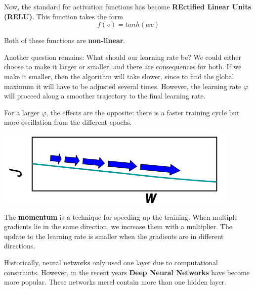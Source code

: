 \documentclass{tufte-handout}
\begin{document}
Now, the standard for activation functions has become \textbf{REctified Linear Units (RELU)}. 
This function takes the form
\[ f(v) = tanh(\alpha v)\]

Both of these functions are \textbf{non-linear}.

Another question remains: What should our learning rate be?
We could either choose to make it larger or smaller, and there are consequences for both.
If we make it smaller, then the algorithm will take slower, since to find the global maximum it 
	will have to be adjusted several times. However, the learning rate $\varphi$ will proceed along
	a smoother trajectory to the final learning rate.

For a larger $\varphi$,  the effects are the opposite: there is a faster training cycle but more
	oscillation from the different epochs.

\begin{marginfigure}
		\includegraphics[scale=0.4]{momentum}
		\caption{ The \textbf{momentum} is a technique for speeding up the training. When multiple
			gradients lie in the same direction, we increase them with a multiplier. The update 
			to the learning rate is smaller when the gradients are in different directions.}
\end{marginfigure}

Historically, neural networks only used one layer due to computational constraints.
However, in the recent years \textbf{Deep Neural Networks} have become more popular. 
These networks merel contain more than one hidden layer.
\end{document}
